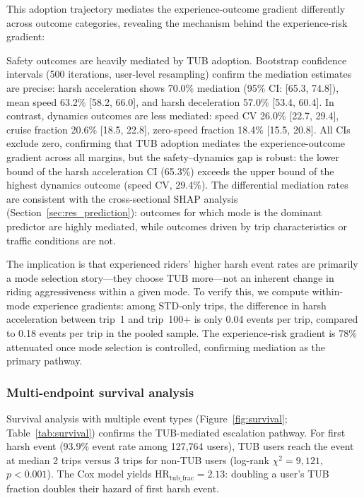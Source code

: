 This adoption trajectory mediates the experience-outcome gradient differently across outcome categories, revealing the mechanism behind the experience-risk gradient:

Safety outcomes are heavily mediated by TUB adoption. Bootstrap confidence intervals (500 iterations, user-level resampling) confirm the mediation estimates are precise: harsh acceleration shows 70.0\% mediation (95\% CI: [65.3, 74.8]), mean speed 63.2\% [58.2, 66.0], and harsh deceleration 57.0\% [53.4, 60.4]. In contrast, dynamics outcomes are less mediated: speed CV 26.0\% [22.7, 29.4], cruise fraction 20.6\% [18.5, 22.8], zero-speed fraction 18.4\% [15.5, 20.8]. All CIs exclude zero, confirming that TUB adoption mediates the experience-outcome gradient across all margins, but the safety--dynamics gap is robust: the lower bound of the harsh acceleration CI (65.3\%) exceeds the upper bound of the highest dynamics outcome (speed CV, 29.4\%). The differential mediation rates are consistent with the cross-sectional SHAP analysis (Section~\ref{sec:res_prediction}): outcomes for which mode is the dominant predictor are highly mediated, while outcomes driven by trip characteristics or traffic conditions are not.

The implication is that experienced riders' higher harsh event rates are primarily a mode selection story---they choose TUB more---not an inherent change in riding aggressiveness within a given mode. To verify this, we compute within-mode experience gradients: among STD-only trips, the difference in harsh acceleration between trip~1 and trip~100+ is only 0.04 events per trip, compared to 0.18 events per trip in the pooled sample. The experience-risk gradient is 78\% attenuated once mode selection is controlled, confirming mediation as the primary pathway.

\subsubsection{Multi-endpoint survival analysis}

Survival analysis with multiple event types (Figure~\ref{fig:survival}; Table~\ref{tab:survival}) confirms the TUB-mediated escalation pathway. For first harsh event (93.9\% event rate among 127,764 users), TUB users reach the event at median 2 trips versus 3 trips for non-TUB users (log-rank $\chi^2 = 9{,}121$, $p < 0.001$). The Cox model yields HR$_{\text{tub\_frac}} = 2.13$: doubling a user's TUB fraction doubles their hazard of first harsh event.

